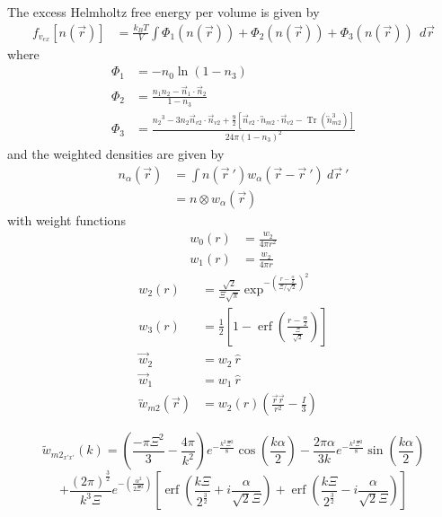 \documentclass[double,12pt]{beavtex}
\begin{document}
The excess Helmholtz free energy per volume is given by
\begin{align}
    f_{v_{ex}}[n(\vec r)] &= \frac{k_BT}{V}\int\Phi_1(n(\vec r))
    +\Phi_2(n(\vec r))+\Phi_3(n(\vec r))~~d\vec r
\end{align}     
where
\begin{align}
    \Phi_1 &= -n_{0}\ln(1-n_{3}) \\
    \Phi_2 &= \frac{n_1n_2-\vec n_1\cdot\vec n_2}{1-n_3} \\
    \Phi_3 &= \frac{{n_2}^3-3n_2\vec n_{v2}\cdot\vec n_{v2}+\frac{9}{2}
       [\vec n_{v2}\cdot{\overleftrightarrow{n}_{m2}}\cdot{\vec n_{v2}}
       -\operatorname{Tr}({\overleftrightarrow n^3_{m2}})]}{24\pi(1-n_3)^2}  
\end{align}
and the weighted densities are given by 
\begin{align}
    n_\alpha(\vec r) &= \int n(\vec {r}~')w_\alpha(\vec r-\vec {r}~')
                    ~d\vec {r}~'  \label{weighted_densities}  \\
                     &= n\otimes w_\alpha(\vec r)
\end{align}  
with weight functions
\begin{align}\label{eq:weights}
  w_{0}(r) &=\frac{w_{2}}{4\pi{r}^2} \\
  w_{1}(r) &=\frac{w_{2}}{4\pi{r}} 
\end{align}
\begin{align}
  w_2(r) &=\frac{\sqrt{2}}{\Xi\sqrt\pi}\exp^{-\left(\frac{r-\frac{\alpha}
           {2}}{\Xi/\sqrt{2}}\right)^2}  \\
  w_3(r) &=\frac{1}{2}\left[1-\operatorname{erf}\left(\frac{r
          -\frac{\alpha}{2}}{\frac{\Xi}{\sqrt{2}}}\right)\right]  \\
%    
      \vec {w}_2 &= w_2~\hat r \\
      \vec {w}_1 &= w_1~\hat r \\
      \overleftrightarrow{w}_{m2}(\vec{r}) &= w_2(r)\left(\frac{\vec{r}
                                        \vec{r}}{r^2}-\frac{I}{3}\right) 
\end{align}

\begin{equation}
    {\widetilde{w}_{{m2}_{x'x'}}(k)=\left(\frac{-\pi{\Xi}^2}{3}
   -\frac{4\pi}{k^2}\right)e^{-\frac{k^2\Xi^2}{8}}\cos(\frac{k\alpha}{2})
   -\frac{2\pi\alpha}{3k}e^{-\frac{k^2\Xi^2}{8}}\sin(\frac{k\alpha}{2})}
   \nonumber
\end{equation} 
\begin{equation} %
   {+\frac{{(2\pi)}^{\frac{3}{2}}}{k^3\Xi}e^{-\left(\frac{\alpha^2}
   {2\Xi^2}\right)}\left[\operatorname{erf}\left(\frac{k\Xi}{2^\frac{3}{2}}
   +i\frac{\alpha}{\sqrt{2}\Xi}\right)+\operatorname{erf}\left(\frac{k\Xi}
   {2^\frac{3}{2}}-i\frac{\alpha}{\sqrt{2}\Xi}\right)\right]}
\end{equation} 
\end{document}
